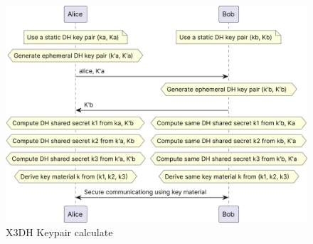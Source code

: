 \documentclass[9pt,a4paper,twoside]{rho-class/rho}
\begin{document}
\begin{figure}[H]
    \centering
    \includegraphics[width=\linewidth]{figures/image.png}
    \caption{X3DH Keypair calculate\cite{X3DH_Note}}
    \label{fig:3}
\end{figure}
\end{document}
